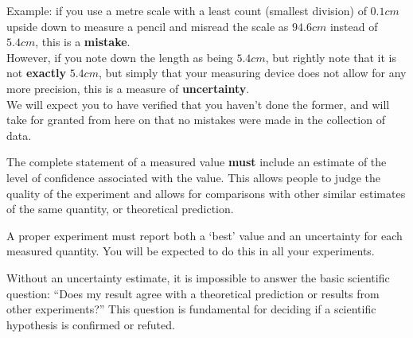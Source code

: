\begin{tip}
Example: if you use a metre scale with a least count (smallest division) of $0.1cm$ upside down to measure a pencil and misread the scale as $94.6cm$ instead of $5.4cm$, this is a \textbf{mistake}.\\

However, if you note down the length as being $5.4cm$, but rightly note that it is not \textbf{exactly} $5.4cm$, but simply that your measuring device does not allow for any more precision, this is a measure of \textbf{uncertainty}. \\

We will expect you to have verified that you haven't done the former, and will take for granted from here on that no mistakes were made in the collection of data.
\end{tip}


The complete statement of a measured value \textbf{must} include an estimate of the level of confidence associated with the value. This allows people to judge the quality of the experiment and allows for comparisons with other similar estimates of the same quantity, or theoretical prediction.  

\begin{imp}
A proper experiment must report both a `best' value and an uncertainty for each measured quantity. You will be expected to do this in all your experiments. 
\end{imp}

Without an uncertainty estimate, it is impossible to answer the basic scientific question: ``Does my result agree with a theoretical prediction or results from other experiments?'' This question is fundamental for deciding if a scientific hypothesis is confirmed or refuted.

